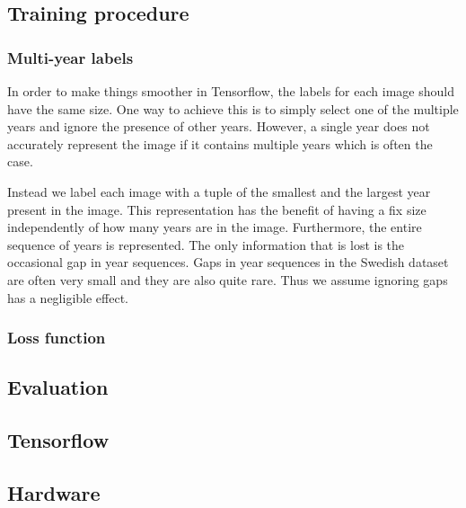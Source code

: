 \subsection{Training procedure}

\subsubsection{Multi-year labels}

In order to make things smoother in Tensorflow, the labels for each image should have the same size. One way to achieve this is to simply select one of the multiple years and ignore the presence of other years. However, a single year does not accurately represent the image if it contains multiple years which is often the case.

Instead we label each image with a tuple of the smallest and the largest year present in the image. This representation has the benefit of having a fix size independently of how many years are in the image. Furthermore, the entire sequence of years is represented. The only information that is lost is the occasional gap in year sequences. Gaps in year sequences in the Swedish dataset are often very small and they are also quite rare. Thus we assume ignoring gaps has a negligible effect.




\subsubsection{Loss function}


\subsection{Evaluation}



\subsection{Tensorflow}


\subsection{Hardware}
